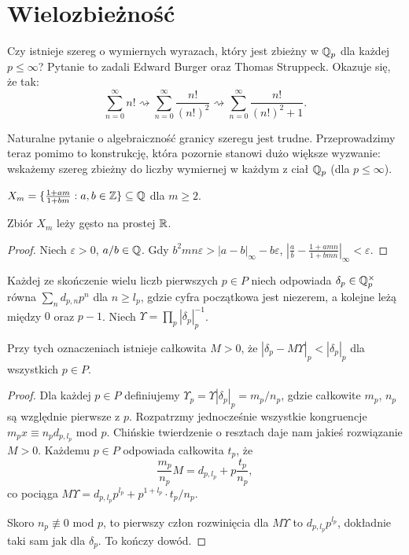 \section{Wielozbieżność \label{burger}}
Czy istnieje szereg o wymiernych wyrazach, który jest zbieżny w $\mathbb Q_p$ dla każdej $p \le \infty$?
Pytanie to zadali Edward Burger oraz Thomas Struppeck. %
Okazuje się, że tak:
\[
	\sum_{n=0}^\infty n! \rightsquigarrow \sum_{n=0}^\infty \frac{n!}{(n!)^2} \rightsquigarrow \sum_{n=0}^\infty \frac{n!}{(n!)^2+1}.
\]

Naturalne pytanie o algebraiczność granicy szeregu jest trudne.
Przeprowadzimy teraz pomimo to konstrukcję, która pozornie stanowi dużo większe wyzwanie: wskażemy szereg zbieżny do liczby wymiernej w każdym z ciał $\mathbb Q_p$ (dla $p \le \infty$).

\begin{definicja}
	$X_m = \{\frac{1+am}{1 + bm} : a, b \in \mathbb Z\} \subseteq \mathbb Q$ dla $m \ge 2$.
\end{definicja}

\begin{lemat}[III]
	Zbiór $X_m$ leży gęsto na prostej $\mathbb R$.
\end{lemat}

\begin{proof}
	Niech $\varepsilon > 0$, $a/b \in \mathbb Q$.
	Gdy $b^2mn \varepsilon > |a-b|_\infty - b\varepsilon$,
	$|\frac ab- \frac{1+amn}{1 + bmn}|_\infty < \varepsilon$.
\end{proof}

Każdej ze skończenie wielu liczb pierwszych $p \in P$ niech odpowiada $\delta_p \in \mathbb Q_p^\times$ równa $\sum_n d_{p, n} p^n$ dla $n \ge l_p$, gdzie cyfra początkowa jest niezerem, a kolejne leżą między $0$ oraz $p-1$.
Niech $\Upsilon = \prod_p |\delta_p|_p^{-1}$.

\begin{lemat}[IV]
	Przy tych oznaczeniach istnieje całkowita $M > 0$, że $|\delta_p - M \Upsilon|_p < |\delta_p|_p$ dla wszystkich $p \in P$.
\end{lemat}

\begin{proof}
	Dla każdej $p \in P$ definiujemy $\Upsilon_p = \Upsilon |\delta_p|_p = m_p / n_p$, gdzie całkowite $m_p$, $n_p$ są względnie pierwsze z $p$.
	Rozpatrzmy jednocześnie wszystkie kongruencje $m_p x \equiv n_p d_{p, l_p}$ mod $p$.
	Chińskie twierdzenie o resztach daje nam jakieś rozwiązanie $M > 0$.
	Każdemu $p \in P$ odpowiada całkowita $t_p$, że
	\[
		\frac{m_p}{n_p} M = d_{p, l_p} + p \frac{t_p}{n_p},
	\]
	co pociąga $M \Upsilon = d_{p, l_p} p^{l_p} + p^{1+l_p} \cdot {t_p} / {n_p}$. 

	Skoro $n_p \not\equiv 0$ mod $p$, to pierwszy człon rozwinięcia dla $M \Upsilon$ to $d_{p, l_p}p^{l_p}$, dokładnie taki sam jak dla $\delta_p$. 
	To kończy dowód.
\end{proof}

